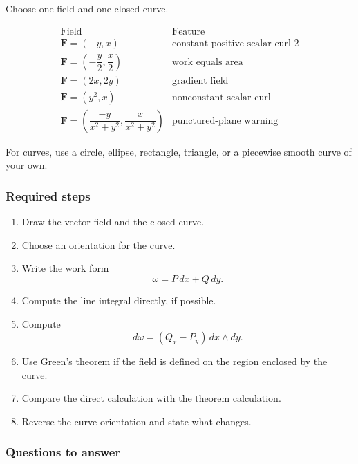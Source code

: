Choose one field and one closed curve.

\[
\begin{array}{c|c}
\text{Field} & \text{Feature} \\ \hline
\mathbf F=(-y,x) & \text{constant positive scalar curl }2\\[1mm]
\mathbf F=\left(-\dfrac y2,\dfrac x2\right) & \text{work equals area}\\[4mm]
\mathbf F=(2x,2y) & \text{gradient field}\\[1mm]
\mathbf F=(y^2,x) & \text{nonconstant scalar curl}\\[1mm]
\mathbf F=\left(\dfrac{-y}{x^2+y^2},\dfrac{x}{x^2+y^2}\right)
& \text{punctured-plane warning}
\end{array}
\]

For curves, use a circle, ellipse, rectangle, triangle, or a piecewise smooth curve of
your own.

\subsubsection*{Required steps}

\begin{enumerate}
\item Draw the vector field and the closed curve.

\item Choose an orientation for the curve.

\item Write the work form
\[
    \omega=P\,dx+Q\,dy.
\]

\item Compute the line integral directly, if possible.

\item Compute
\[
    d\omega=(Q_x-P_y)\,dx\wedge dy.
\]

\item Use Green's theorem if the field is defined on the region enclosed by the curve.

\item Compare the direct calculation with the theorem calculation.

\item Reverse the curve orientation and state what changes.
\end{enumerate}

\subsubsection*{Questions to answer}


